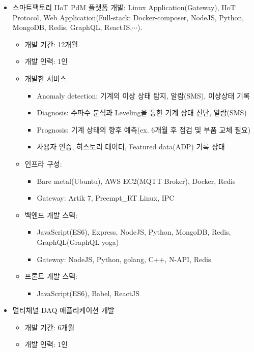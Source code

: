 \begin{itemize}
	\item 스마트팩토리 IIoT PdM 플랫폼 개발: Linux Application(Gateway), IIoT Protocol, Web Application(Full-stack: Docker-composer, NodeJS, Python, MongoDB, Redis, GraphQL, ReactJS,$\cdots$).
  \begin{itemize}[label=$\star$]
    \item 개발 기간: 12개월
    \item 개발 인력: 1인
    \item 개발한 서비스
    \begin{itemize}
      \item Anomaly detection: 기계의 이상 상태 탐지, 알람(SMS), 이상상태 기록
      \item Diagnosis: 주파수 분석과 Leveling을 통한 기계 상태 진단, 알람(SMS)
      \item Prognosis: 기계 상태의 향후 예측(ex. 6개월 후 점검 및 부품 교체 필요)
      \item 사용자 인증, 히스토리 데이터, Featured data(ADP) 기록 상태
    \end{itemize}
    \item 인프라 구성:
    \begin{itemize}
      \item Bare metal(Ubuntu), AWS EC2(MQTT Broker), Docker, Redis
      \item Gateway: Artik 7, Preempt\_RT Linux, IPC
    \end{itemize}
    \item 백엔드 개발 스택:
    \begin{itemize}
      \item JavaScript(ES6), Express, NodeJS, Python, MongoDB, Redis, GraphQL(GraphQL yoga)
      \item Gateway: NodeJS, Python, golang, C++, N-API, Redis
    \end{itemize}
    \item 프론트 개발 스택:
    \begin{itemize}
      \item JavaScript(ES6), Babel, ReactJS
    \end{itemize}
  \end{itemize}
	\item 멀티채널 DAQ 애플리케이션 개발
	\begin{itemize}
    \item 개발 기간: 6개월
    \item 개발 인력: 1인

\end{itemize}
\end{itemize}
